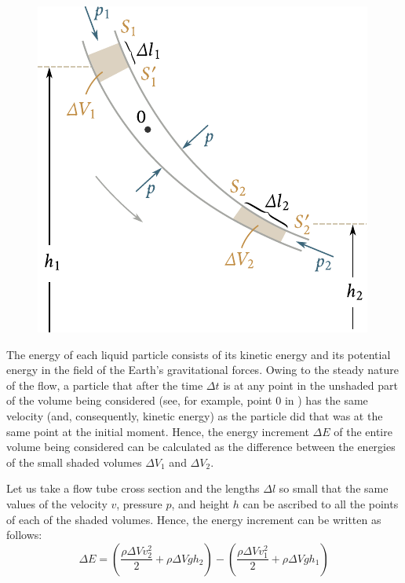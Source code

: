 \begin{figure}[t]
	\begin{center}
		\includegraphics[scale=1.0]{figures/ch_09/fig_9_5.pdf}
		\caption[]{}
		\label{fig:9_5}
	\end{center}
	\vspace{-0.8cm}
\end{figure}

The energy of each liquid particle consists of its kinetic energy and its potential energy in the field of the Earth's gravitational forces. Owing to the steady nature of the flow, a particle that after the time $\Delta t$ is at any point in the unshaded part of the volume being considered (see, for example, point $0$ in ) has the same velocity (and, consequently, kinetic energy) as the particle did that was at the same point at the initial moment. Hence, the energy increment $\Delta E$ of the entire volume being considered can be calculated as the difference between the energies of the small shaded volumes $\Delta V_1$ and $\Delta V_2$.

Let us take a flow tube cross section and the lengths $\Delta l$ so small that the same values of the velocity $v$, pressure $p$, and height $h$ can be ascribed to all the points of each of the shaded volumes. Hence, the energy increment can be written as follows:
\vspace{-12pt}
\begin{equation}\label{eq:9_2}
	\Delta E = \left(\frac{\rho\Delta V v_2^2}{2} + \rho\Delta V gh_2\right) - \left(\frac{\rho\Delta V v_1^2}{2} + \rho\Delta V gh_1\right)
\end{equation}

